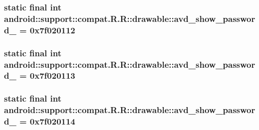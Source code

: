 \hypertarget{classandroid_1_1support_1_1compat_1_1_r_1_1drawable_82d0ab208263a7a13ede06fcc69103c9}{
\subsubsection[{avd\_\-show\_\-password\_\-1}]{\setlength{\rightskip}{0pt plus 5cm}static final int android::support::compat.R.R::drawable::avd\_\-show\_\-password\_ = 0x7f020112}}
\label{classandroid_1_1support_1_1compat_1_1_r_1_1drawable_82d0ab208263a7a13ede06fcc69103c9}


\hypertarget{classandroid_1_1support_1_1compat_1_1_r_1_1drawable_5068904d83465a3747e5a0aee9cc3f50}{
\subsubsection[{avd\_\-show\_\-password\_\-2}]{\setlength{\rightskip}{0pt plus 5cm}static final int android::support::compat.R.R::drawable::avd\_\-show\_\-password\_ = 0x7f020113}}
\label{classandroid_1_1support_1_1compat_1_1_r_1_1drawable_5068904d83465a3747e5a0aee9cc3f50}


\hypertarget{classandroid_1_1support_1_1compat_1_1_r_1_1drawable_3330f87516843c34d137ac3a4c33b9d0}{
\subsubsection[{avd\_\-show\_\-password\_\-3}]{\setlength{\rightskip}{0pt plus 5cm}static final int android::support::compat.R.R::drawable::avd\_\-show\_\-password\_ = 0x7f020114}}
\label{classandroid_1_1support_1_1compat_1_1_r_1_1drawable_3330f87516843c34d137ac3a4c33b9d0}


